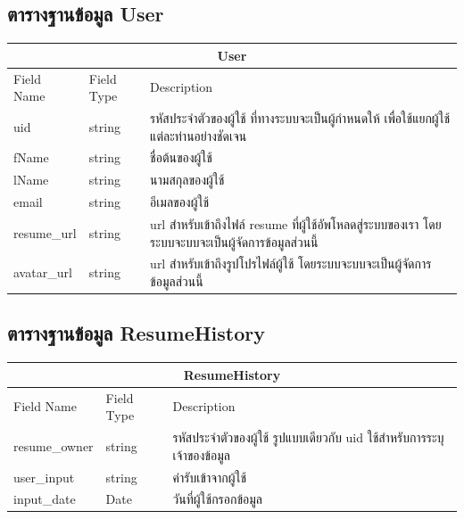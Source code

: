 \subsection{ตารางฐานข้อมูล User}
\begin{table}[H]
  \begin{tabular*}{\textwidth}{l|l|p{}}
  \hline
  \multicolumn{3}{c}{User}                                                                                                      \\ \hline
  Field Name  & Field Type & Description                                                                                        \\ \hline
  uid         & string     & รหัสประจำตัวของผู้ใช้ ที่ทางระบบจะเป็นผู้กำหนดให้ เพื่อใช้แยกผู้ใช้แต่ละท่านอย่างชัดเจน            \\
  fName       & string     & ชื่อต้นของผู้ใช้                                                                                   \\
  lName       & string     & นามสกุลของผู้ใช้                                                                                   \\
  email       & string     & อีเมลของผู้ใช้                                                                                     \\
  resume\_url & string     & url สำหรับเข้าถึงไฟล์ resume ที่ผู้ใช้อัพโหลดสู่ระบบของเรา โดยระบบจะบบจะเป็นผู้จัดการข้อมูลส่วนนี้ \\
  avatar\_url & string     & url สำหรับเข้าถึงรูปโปรไฟล์ผู้ใช้ โดยระบบจะบบจะเป็นผู้จัดการข้อมูลส่วนนี้                          \\ \hline
  \end{tabular*}
\end{table}

\subsection{ตารางฐานข้อมูล ResumeHistory}
\begin{table}[H]
  \begin{tabular*}{\textwidth}{l|l|p{}}
  \hline
  \multicolumn{3}{c}{ResumeHistory}                                                                   \\\hline
  Field Name    & Field Type & Description                                                            \\\hline
  resume\_owner & string     & รหัสประจำตัวของผู้ใช้ รูปแบบเดียวกับ uid ใช้สำหรับการระบุเจ้าของข้อมูล \\
  user\_input   & string     & ค่ารับเข้าจากผู้ใช้                                                    \\
  input\_date   & Date       & วันที่ผู้ใช้กรอกข้อมูล \\ \hline
  \end{tabular*}
\end{table}

